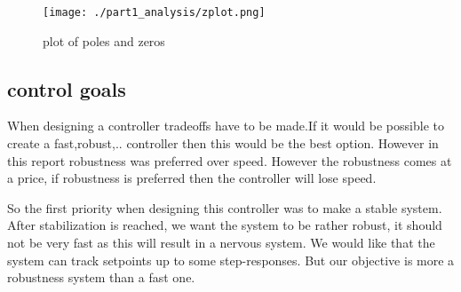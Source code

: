 \begin{figure}[H]
	\centering
	\texttt{[image: ./part1\_analysis/zplot.png]}
	\caption{plot of poles and zeros}
	\label{fig:zplot system}
\end{figure}

\subsection{control goals}
When designing a controller tradeoffs have to be made.If it would be possible to create a fast,robust,.. controller then this would be the best option. However in this report robustness was preferred over speed. However the robustness comes at a price, if robustness is preferred then the controller will lose speed. 

So the first priority when designing this controller was to make a stable system. After stabilization is reached, we want the system to be rather robust, it should not be very fast as this will result in a nervous system. We would like that the system can track setpoints up to some step-responses. But our objective is more a robustness system than a fast one.

